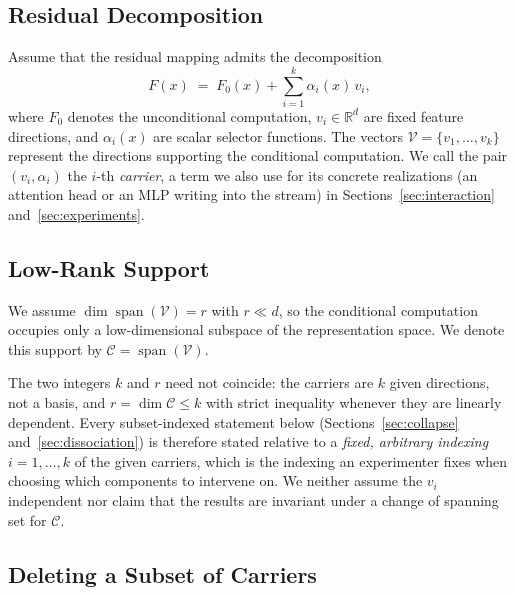 \documentclass[11pt,a4paper]{article}
\begin{document}
\subsection{Residual Decomposition}

Assume that the residual mapping admits the decomposition
\[
F(x) \;=\; F_0(x) + \sum_{i=1}^{k}\alpha_i(x)\,v_i,
\]
where $F_0$ denotes the unconditional computation, $v_i\in\mathbb R^d$ are
fixed feature directions, and $\alpha_i(x)$ are scalar selector functions. The
vectors $\mathcal V=\{v_1,\ldots,v_k\}$ represent the directions supporting the
conditional computation. We call the pair $(v_i,\alpha_i)$ the $i$-th
\emph{carrier}, a term we also use for its concrete realizations (an
attention head or an MLP writing into the stream) in
Sections~\ref{sec:interaction} and~\ref{sec:experiments}.

\subsection{Low-Rank Support}

We assume $\dim\operatorname{span}(\mathcal V)=r$ with $r\ll d$, so the
conditional computation occupies only a low-dimensional subspace of the
representation space. We denote this support by
$\mathcal C=\operatorname{span}(\mathcal V)$.

The two integers $k$ and $r$ need not coincide: the carriers are $k$ given
directions, not a basis, and $r=\dim\mathcal C\le k$ with strict inequality
whenever they are linearly dependent. Every subset-indexed statement below
(Sections~\ref{sec:collapse} and~\ref{sec:dissociation}) is therefore stated
relative to a \emph{fixed, arbitrary indexing} $i=1,\ldots,k$ of the given
carriers, which is the indexing an experimenter fixes when choosing which
components to intervene on. We neither assume the $v_i$ independent nor claim
that the results are invariant under a change of spanning set for
$\mathcal C$.

\subsection{Deleting a Subset of Carriers}
\label{sec:deletion}
\end{document}
